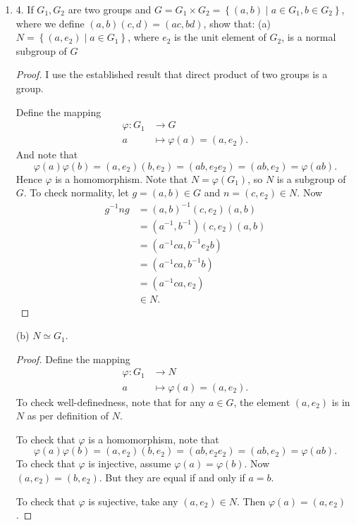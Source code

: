 \begin{enumerate}[resume]
	\item 4. If $G_1, G_2$ are two groups and $G=G_1 \times G_2=\left\{(a, b) \mid a \in G_1, b \in G_2\right\}$, where we define $(a, b)(c, d)=(a c, b d)$, show that:
(a) $N=\left\{\left(a, e_2\right) \mid a \in G_1\right\}$, where $e_2$ is the unit element of $G_2$, is a normal subgroup of $G$
\begin{proof}
	I use the established result that direct product of two groups is a group.

	Define the mapping 
	\begin{align*}
		\varphi: G_1 &\longrightarrow G \\
		a &\longmapsto \varphi(a) = (a,e_2)
	.\end{align*}
	And note that \[
		\varphi(a)\varphi(b) = (a, e_2)(b,e_2)
		=(ab, e_2e_2) = (ab,e_2)=\varphi(ab)
	.\] 
	Hence $\varphi$ is a homomorphism. Note that  $N = \varphi(G_1)$, so $N$ is a subgroup of $G$. 
	To check normality, let $g = (a,b) \in G$ and $n = (c,e_2) \in N$. Now
	\begin{align*}
		g^{-1} ng &= (a,b)^{-1}(c, e_2)(a,b)\\
		&= (a^{-1} ,b^{-1} ) (c, e_2)(a,b)\\
		&= (a^{-1} ca, b^{-1} e_2b) \\
		&= (a^{-1} ca, b^{-1}b) \\
		&= (a^{-1} ca, e_2) \\
		&\in N
	.\end{align*}
\end{proof}

(b) $N \simeq G_1$.
\begin{proof}
	Define the mapping
	\begin{align*}
		\varphi: G_1 &\longrightarrow N \\
		a &\longmapsto \varphi(a) = (a,e_2)
	.\end{align*}
	To check well-definedness, note that for any $a \in G$, the element $(a,e_2)$ is in $N$ as per definition of $N$.

	To check that $\varphi$ is a homomorphism, note that \[
		\varphi(a)\varphi(b) = (a, e_2)(b,e_2)
		=(ab, e_2e_2) = (ab,e_2)=\varphi(ab)
	.\] 
	To check that $\varphi$ is injective, assume $\varphi(a) = \varphi(b)$. Now $(a, e_2) = (b, e_2)$. But they are equal if and only if $a = b$.

	To check that $\varphi$ is sujective, take any $(a, e_2) \in N$. Then $\varphi(a) = (a, e_2)$.


\end{proof}
\end{enumerate}
